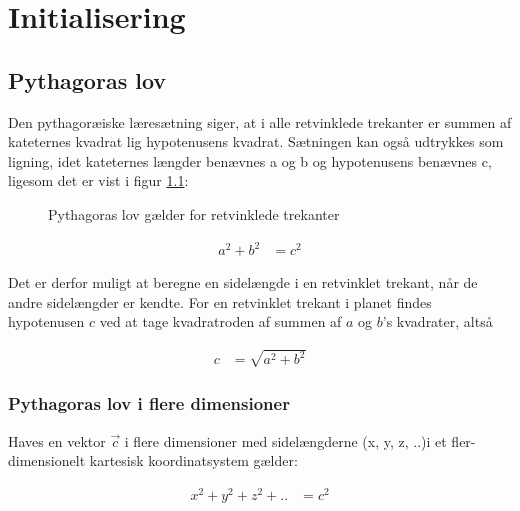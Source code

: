 \documentclass[11pt,a4paper]{memoir}
\begin{document}
\chapter{Initialisering}

\section{Pythagoras lov}
Den pythagoræiske læresætning siger, at i alle retvinklede trekanter er summen af kateternes kvadrat lig hypotenusens kvadrat. Sætningen kan også udtrykkes som ligning, idet kateternes længder benævnes a og b og hypotenusens benævnes c, ligesom det er vist i figur \ref{fig:pythagoras}:

\begin{figure}
\caption{Pythagoras lov gælder for retvinklede trekanter}
\label{fig:pythagoras}
\end{figure}

\begin{equation}
\begin{aligned}
a^2 + b^2 &= c^2
\end{aligned}
\end{equation}

Det er derfor muligt at beregne en sidelængde i en retvinklet trekant, når de andre sidelængder er kendte. For en retvinklet trekant i planet findes hypotenusen $c$ ved at tage kvadratroden af summen af $a$ og $b$'s kvadrater, altså

\begin{equation}
\begin{aligned}
c &= \sqrt{a^2 + b^2}
\end{aligned}
\end{equation}

\FloatBarrier
\subsection{Pythagoras lov i flere dimensioner}
Haves en vektor $\vec{c}$ i flere dimensioner med sidelængderne (x, y, z, ..)i et fler-dimensionelt kartesisk koordinatsystem gælder:

\begin{equation}
\begin{aligned}
x^2 + y^2 + z^2 + .. &= c^2
\end{aligned}
\end{equation}
\end{document}
